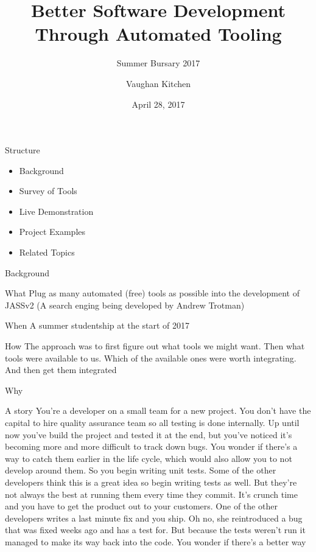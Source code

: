 \documentclass{beamer}
\title{Better Software Development Through Automated Tooling}
\subtitle{Summer Bursary 2017}
\author{Vaughan Kitchen}
\date{April 28, 2017}
\begin{document}
\begin{frame}
\titlepage
\end{frame}

\begin{frame}{Structure}
	\begin{itemize}
		\item Background
		\item Survey of Tools
		\item Live Demonstration
		\item Project Examples
		\item Related Topics
	\end{itemize}
\end{frame}

\begin{frame}{Background}
	\begin{block}{What}
		Plug as many automated (free) tools as possible into the development of JASSv2
		(A search enging being developed by Andrew Trotman)
	\end{block}
	\begin{block}{When}
		A summer studentship at the start of 2017
	\end{block}
	\begin{block}{How}
		The approach was to first figure out what tools we might want. Then what
		tools were available to us. Which of the available ones were worth
		integrating. And then get them integrated
	\end{block}
\end{frame}

\begin{frame}{Why}
	\begin{block}{A story}
		You're a developer on a small team for a new project. You don't have the
		capital to hire quality assurance team so all testing is done internally.
		Up until now you've build the project and tested it at the end, but you've
		noticed it's becoming more and more difficult to track down bugs. You wonder
		if there's a way to catch them earlier in the life cycle, which would also
		allow you to not develop around them. So you begin writing unit tests.
		Some of the other developers think this is a great idea so begin writing tests
		as well. But they're not always the best at running them every time they commit.
		It's crunch time and you have to get the product out to your customers. One of
		the other developers writes a last minute fix and you ship. Oh no, she reintroduced
		a bug that was fixed weeks ago and has a test for. But because the tests weren't
		run it managed to make its way back into the code. You wonder if there's a better
		way
	\end{block}
\end{frame}
\end{document}

